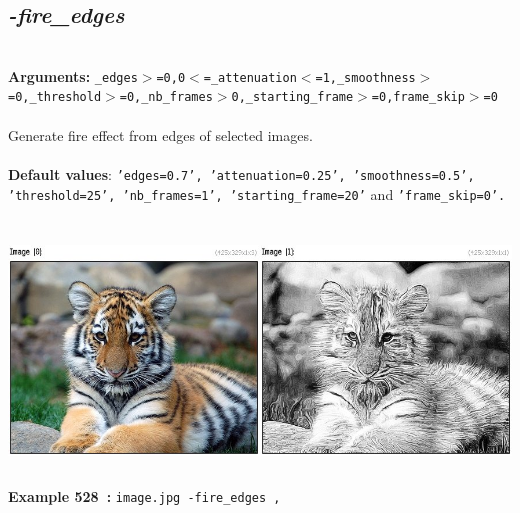 \documentclass[a4paper,11pt,twoside]{book}
\begin{document}
\subsection{\emph{-fire\_edges} }\vspace*{-0.5em}
~\\\textbf{Arguments: } 
{\small \texttt{\_edges$>$=0,0$<$=\_attenuation$<$=1,\_smoothness$>$=0,\_threshold$>$=0,\_nb\_frames$>$0,\_starting\_frame$>$=0,frame\_skip$>$=0}}\\~\\
Generate fire effect from edges of selected images.
~\\~\\\textbf{Default values}: {\small \texttt{'edges=0.7', 'attenuation=0.25', 'smoothness=0.5', 'threshold=25', 'nb\_frames=1', 'starting\_frame=20'} and \texttt{'frame\_skip=0'.}}
\begin{center}\includegraphics[keepaspectratio=true,height=7cm,width=\textwidth]{img/gmic_def528.jpg}\\
{\footnotesize \textbf{Example 528~:} \texttt{image.jpg -fire\_edges ,}}
\end{center}
\end{document}
